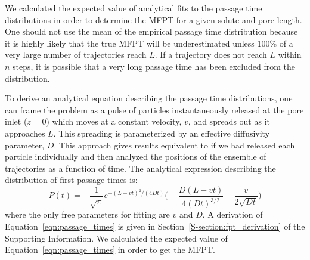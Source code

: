 \documentclass[aps,pre,preprint,groupedaddress]{revtex4-2}
\begin{document}
  We calculated the expected value of analytical fits to the passage time distributions
  in order to determine the MFPT for a given solute and pore length. One should not 
  use the mean of the empirical passage time distribution because it is highly likely
  that the true MFPT will be underestimated unless 100\% of a very large number of 
  trajectories reach $L$. If a trajectory does not reach $L$ within $n$ steps, it is
  possible that a very long passage time has been excluded from the distribution.
  
  
  To derive an analytical equation describing the passage time distributions, 
  one can frame the 
  problem as a pulse of particles instantaneously released at the pore inlet ($z=0$)
  which moves at a constant velocity, $v$, and spreads out as it approaches $L$. 
  This spreading is parameterized by an effective diffusivity parameter, $D$. This 
  approach gives results equivalent to if we had released each particle individually
  and then analyzed the positions of the ensemble of trajectories as 
  a function of time. The analytical expression describing the distribution of 
  first passage times is:~\cite{cussler_diffusion:_2009}
  \begin{equation}
  P(t) = -\frac{1}{\sqrt{\pi}}e^{-(L - vt)^2 / (4Dt)}\bigg(-\frac{D(L - vt)}{4(Dt)^{3/2}} - \frac{v}{2\sqrt{Dt}}\bigg)
  \label{eqn:passage_times}
  \end{equation} 
  where the only free parameters for fitting are $v$ and $D$. A derivation
  of Equation~\ref{eqn:passage_times} is given in Section~\ref{S-section:fpt_derivation}
  of the Supporting Information. We calculated the expected value of 
  Equation~\ref{eqn:passage_times} in order to get the MFPT.
\end{document}
